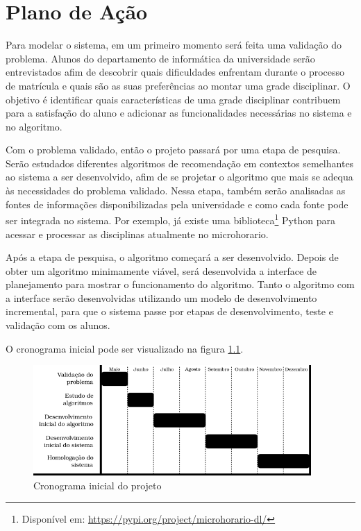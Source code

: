 
\chapter{Plano de Ação}
\label{cha:Plano de Ação}

Para modelar o sistema, em um primeiro momento será feita uma validação do problema. Alunos do departamento de informática da universidade serão entrevistados afim de descobrir quais dificuldades enfrentam durante o processo de matrícula e quais são as suas preferências ao montar uma grade disciplinar. O objetivo é identificar quais características de uma grade disciplinar contribuem para a satisfação do aluno e adicionar as funcionalidades necessárias no sistema e no algoritmo.

Com o problema validado, então o projeto passará por uma etapa de pesquisa. 
Serão estudados diferentes algoritmos de recomendação em contextos semelhantes ao sistema a ser desenvolvido, afim de se projetar o algoritmo que mais se adequa às necessidades do problema validado. 
Nessa etapa, também serão analisadas as fontes de informações disponibilizadas pela universidade e como cada fonte pode ser integrada no sistema. 
Por exemplo, já existe uma biblioteca\footnote{Dispon\'ivel em: \url{https://pypi.org/project/microhorario-dl/}} Python para acessar e processar as disciplinas atualmente no microhorario.

Após a etapa de pesquisa, o algoritmo começará a ser desenvolvido. 
Depois de obter um algoritmo minimamente viável, será desenvolvida a interface de planejamento para mostrar o funcionamento do algoritmo. 
Tanto o algoritmo com a interface serão desenvolvidas utilizando um modelo de desenvolvimento incremental, para que o sistema passe por etapas de desenvolvimento, teste e validação com os alunos. 

O cronograma inicial pode ser visualizado na figura \ref{fig-cronograma}.

\begin{figure}[h]
    \begin{center}
    \includegraphics[width=300pt]{figuras/cronograma}
    \caption{Cronograma inicial do projeto}
    \label{fig-cronograma}
    \end{center}
\end{figure}